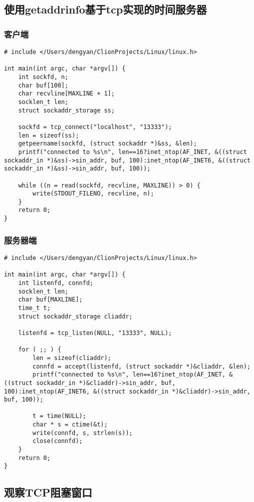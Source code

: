 \subsection{使用getaddrinfo基于tcp实现的时间服务器}
\subsubsection{客户端}
\begin{verbatim}
# include </Users/dengyan/ClionProjects/Linux/linux.h>

int main(int argc, char *argv[]) {
    int sockfd, n;
    char buf[100];
    char recvline[MAXLINE + 1];
    socklen_t len;
    struct sockaddr_storage ss;

    sockfd = tcp_connect("localhost", "13333");
    len = sizeof(ss);
    getpeername(sockfd, (struct sockaddr *)&ss, &len);
    printf("connected to %s\n", len==16?inet_ntop(AF_INET, &((struct sockaddr_in *)&ss)->sin_addr, buf, 100):inet_ntop(AF_INET6, &((struct sockaddr_in *)&ss)->sin_addr, buf, 100));

    while ((n = read(sockfd, recvline, MAXLINE)) > 0) {
        write(STDOUT_FILENO, recvline, n);
    }
    return 0;
}
\end{verbatim}

\subsubsection{服务器端}
\begin{verbatim}
# include </Users/dengyan/ClionProjects/Linux/linux.h>

int main(int argc, char *argv[]) {
    int listenfd, connfd;
    socklen_t len;
    char buf[MAXLINE];
    time_t t;
    struct sockaddr_storage cliaddr;

    listenfd = tcp_listen(NULL, "13333", NULL);

    for ( ;; ) {
        len = sizeof(cliaddr);
        connfd = accept(listenfd, (struct sockaddr *)&cliaddr, &len);
        printf("connected to %s\n", len==16?inet_ntop(AF_INET, &((struct sockaddr_in *)&cliaddr)->sin_addr, buf, 100):inet_ntop(AF_INET6, &((struct sockaddr_in *)&cliaddr)->sin_addr, buf, 100));

        t = time(NULL);
        char * s = ctime(&t);
        write(connfd, s, strlen(s));
        close(connfd);
    }
    return 0;
}
\end{verbatim}
\newpage

\subsection{观察TCP阻塞窗口}
